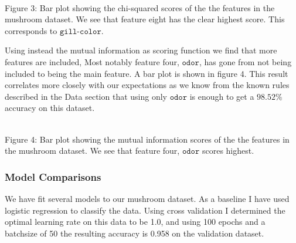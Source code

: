 \documentclass[11pt]{article}
\begin{document}
\begin{center}
\end{center}
{ \hspace*{\fill} \\}

	Figure 3: Bar plot showing the chi-squared scores of the the
	features in the mushroom dataset. We see that feature eight has the
	clear highest score. This corresponds to \(\texttt{gill-color}\).

Using instead the mutual information as scoring function we find that
more features are included, Most notably feature four,
\(\texttt{odor}\), has gone from not being included to being the main
feature. A bar plot is shown in figure 4. This result correlates
more closely with our expectations as we know from the known rules
described in the Data section that using only \(\texttt{odor}\) is
enough to get a \(98.52\%\) accuracy on this dataset.

    
\begin{center}
\end{center}
{ \hspace*{\fill} \\}
    Figure 4: Bar plot showing the mutual information scores of the the
features in the mushroom dataset. We see that feature four,
\(\texttt{odor}\) scores highest.

    \hypertarget{model-comparisons}{%
	\subsubsection{Model Comparisons}\label{model-comparisons}}

We have fit several models to our mushroom dataset. As a baseline I have used logistic regression to classify the data. Using cross validation I determined the optimal learning rate on this data to be 1.0, and using 100 epochs and a batchsize of 50 the resulting accuracy is 0.958 on the validation dataset.
\end{document}
